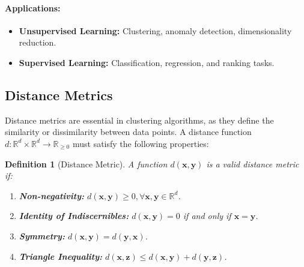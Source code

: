 \documentclass[12pt,a4paper]{article}
\newtheorem{definition}{Definition}
\begin{document}
\paragraph{Applications:}
\begin{itemize}
    \item \textbf{Unsupervised Learning:} Clustering, anomaly detection, dimensionality reduction.
    \item \textbf{Supervised Learning:} Classification, regression, and ranking tasks.
\end{itemize}

\subsection{Distance Metrics}
Distance metrics are essential in clustering algorithms, as they define the similarity or dissimilarity between data points. A distance function $d: \mathbb{R}^d \times \mathbb{R}^d \to \mathbb{R}_{\geq 0}$ must satisfy the following properties:

\begin{definition}[Distance Metric]
A function $d(\mathbf{x}, \mathbf{y})$ is a valid distance metric if:
\begin{enumerate}
    \item \textbf{Non-negativity:} $d(\mathbf{x}, \mathbf{y}) \geq 0, \forall \mathbf{x}, \mathbf{y} \in \mathbb{R}^d$.
    \item \textbf{Identity of Indiscernibles:} $d(\mathbf{x}, \mathbf{y}) = 0$ if and only if $\mathbf{x} = \mathbf{y}$.
    \item \textbf{Symmetry:} $d(\mathbf{x}, \mathbf{y}) = d(\mathbf{y}, \mathbf{x})$.
    \item \textbf{Triangle Inequality:} $d(\mathbf{x}, \mathbf{z}) \leq d(\mathbf{x}, \mathbf{y}) + d(\mathbf{y}, \mathbf{z})$.
\end{enumerate}
\end{definition}
\end{document}
